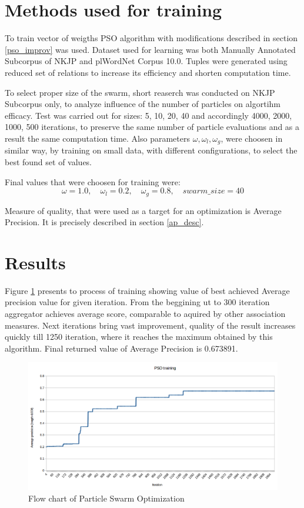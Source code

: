 \section{Methods used for training}
To train vector of weigths PSO algorithm with modifications described in section \ref{pso_improv} was used. 
Dataset used for learning was both Manually Annotated Subcorpus of NKJP and plWordNet Corpus 10.0. Tuples were generated using reduced set of relations
to increase its efficiency and shorten computation time.

To select proper size of the swarm, short reaserch was conducted on NKJP Subcorpus only, to analyze influence of the number of particles on 
algortihm efficacy. Test was carried out for sizes: 5, 10, 20, 40 and accordingly 4000, 2000, 1000, 500 iterations, 
to preserve the same number of particle evaluations and as a result the same computation time.
Also parameters \(\omega, \omega _l, \omega _g\), were choosen in similar way, by training on small data, with different configurations, 
to select the best found set of values.

Final values that were choosen for training were: \\
\[
\omega = 1.0, \quad
\omega _l = 0.2, \quad
\omega _g = 0.8, \quad
swarm\_size = 40
\]

Measure of quality, that were used as a target for an optimization is Average Precision. It is precisely described in section \ref{ap_desc}.
\section{Results}
Figure \ref{pso_train} presents to process of training showing value of best achieved Average precision value for given iteration.
From the beggining ut to 300 iteration aggregator achieves average score, comparable to aquired by other association measures. 
Next iterations bring vast improvement, quality of the result increases quickly till 1250 iteration, where it reaches the maximum 
obtained by this algorithm. Final returned value of Average Precision is 0.673891.


\begin{figure}[ht]
    \centering
    \includegraphics[scale=0.45]{img/pso_train.png}
    \caption{Flow chart of Particle Swarm Optimization}
    \label{pso_train}
\end{figure}